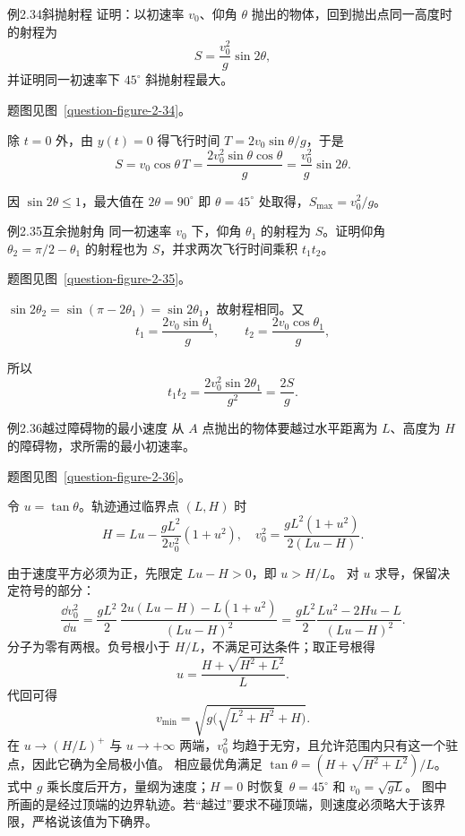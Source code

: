 \begin{origexamplebox}{例2.34\quad 斜抛射程}
证明：以初速率 $v_0$、仰角 $\theta$ 抛出的物体，回到抛出点同一高度时的射程为
\[
 S=\frac{v_0^2}{g}\sin2\theta,
\]
并证明同一初速率下 $45^\circ$ 斜抛射程最大。
\par 题图见图~\ref{question-figure-2-34}。
\KQuestionBI
\end{origexamplebox}
\begin{xesolution}
除 $t=0$ 外，由 $y(t)=0$ 得飞行时间 $T=2v_0\sin\theta/g$，于是
\[
 S=v_0\cos\theta\,T
 =\frac{2v_0^2\sin\theta\cos\theta}{g}
 =\boxed{\frac{v_0^2}{g}\sin2\theta}.
\]
\ProjectileRangeDiagram

因 $\sin2\theta\le1$，最大值在 $2\theta=90^\circ$ 即 $\boxed{\theta=45^\circ}$ 处取得，$S_{\max}=v_0^2/g$。
\end{xesolution}

\ifdefined\Needspace{}\fi
\begin{origexamplebox}{例2.35\quad 互余抛射角}
同一初速率 $v_0$ 下，仰角 $\theta_1$ 的射程为 $S$。证明仰角 $\theta_2=\pi/2-\theta_1$ 的射程也为 $S$，并求两次飞行时间乘积 $t_1t_2$。
\par 题图见图~\ref{question-figure-2-35}。
\KQuestionBJ
\end{origexamplebox}
\begin{xesolution}
$\sin2\theta_2=\sin(\pi-2\theta_1)=\sin2\theta_1$，故射程相同。又
\[
t_1=\frac{2v_0\sin\theta_1}{g},\qquad
t_2=\frac{2v_0\cos\theta_1}{g},
\]
\ComplementaryProjectileDiagram

所以
\[
 t_1t_2=\frac{2v_0^2\sin2\theta_1}{g^2}
 =\boxed{\frac{2S}{g}}.
\]
\end{xesolution}

\begin{origexamplebox}{例2.36\quad 越过障碍物的最小速度}
从 $A$ 点抛出的物体要越过水平距离为 $L$、高度为 $H$ 的障碍物，求所需的最小初速率。
\par 题图见图~\ref{question-figure-2-36}。
\KQuestionBK
\end{origexamplebox}
\begin{xesolution}
令 $u=\tan\theta$。轨迹通过临界点 $(L,H)$ 时
\[
H=Lu-\frac{gL^2}{2v_0^2}(1+u^2),
\quad
v_0^2=\frac{gL^2(1+u^2)}{2(Lu-H)}.
\]
\ObstacleClearanceDiagram

由于速度平方必须为正，先限定 $Lu-H>0$，即 $u>H/L$。
对 $u$ 求导，保留决定符号的部分：
\[
 \frac{\dd v_0^2}{\dd u}
 =\frac{gL^2}{2}\,
 \frac{2u(Lu-H)-L(1+u^2)}{(Lu-H)^2}
 =\frac{gL^2}{2}\frac{Lu^2-2Hu-L}{(Lu-H)^2}.
\]
分子为零有两根。负号根小于 $H/L$，不满足可达条件；取正号根得
\[
u=\frac{H+\sqrt{H^2+L^2}}{L}.
\]
代回可得
\[
 \boxed{v_{\min}=\sqrt{g\bigl(\sqrt{L^2+H^2}+H\bigr)}}.
\]
在 $u\to(H/L)^+$ 与 $u\to+\infty$ 两端，$v_0^2$ 均趋于无穷，且允许范围内只有这一个驻点，因此它确为全局极小值。
相应最优角满足 $\tan\theta=(H+\sqrt{H^2+L^2})/L$。
式中 $g$ 乘长度后开方，量纲为速度；$H=0$ 时恢复 $\theta=45^\circ$ 和 $v_0=\sqrt{gL}$。
图中所画的是经过顶端的边界轨迹。若“越过”要求不碰顶端，则速度必须略大于该界限，严格说该值为下确界。
\end{xesolution}


